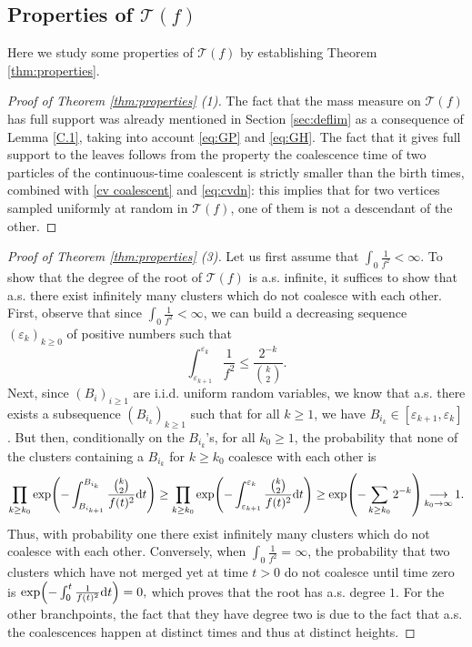 \documentclass[11pt]{article}
\theoremstyle{plain}
\theoremstyle{definition}
\theoremstyle{remark}
\newcommand{\1}{\mathbbm{1}} %
\newcommand{\e}{\varepsilon} %
\newcommand{\T}{\mathcal{T}} %
\let\originalleft\left
\let\originalright\right
\renewcommand{\left}{\mathopen{}\mathclose\bgroup\originalleft}
\renewcommand{\right}{\aftergroup\egroup\originalright}
\begin{document}
\subsection{Properties of $\mathcal{T}(f)$}


Here we study some properties of $\mathcal{T}(f)$ by establishing Theorem \ref{thm:properties}. 

\begin{proof}[Proof of Theorem \ref{thm:properties} (1)]
The fact that the mass measure on $\mathcal{T}(f)$ has full support was already mentioned in Section \ref{sec:deflim} as a consequence of Lemma \ref{C.1}, taking into account \eqref{eq:GP} and \eqref{eq:GH}.  The fact that it gives full support to the leaves follows from the property the coalescence time of two particles of the continuous-time coalescent is strictly smaller than the birth times, combined with \eqref{cv coalescent} and \eqref{eq:cvdn}: this implies that for two vertices sampled uniformly at random in $\mathcal{T}(f)$, one of them is not a descendant of the other.
\end{proof}

\begin{proof}[Proof of Theorem \ref{thm:properties} (3)]
Let us first assume that $\int_0 \frac{1}{f^2}<\infty$. To show that the degree of the root of $\T(f)$ is a.s. infinite, it suffices to show that a.s. there exist infinitely many clusters which do not coalesce with each other.
First, observe that since $\int_0 \frac{1}{f^2} <\infty$, we can build a decreasing sequence $(\e_k)_{k\ge 0}$ of positive numbers such that
\[
\int_{\e_{k+1}}^{\e_k} \frac{1}{f^2} \le \frac{2^{-k}}{\binom{k}{2}}.
\]
Next, since $(B_i)_{i\ge 1}$ are i.i.d. uniform random variables, we know that a.s. there exists a subsequence $(B_{i_k})_{k\ge 1}$ such that for all $k\ge 1$, we have $B_{i_k} \in [\e_{k+1},\e_k]$. But then, conditionally on the $B_{i_k}$'s, for all $k_0\ge 1$, the probability that none of the clusters containing a $B_{i_k}$ for $k\ge k_0$ coalesce with each other is
\[
\prod_{k\ge k_0} \exp \left(
-\int_{B_{i_{k+1}}}^{B_{i_k}} \frac{\binom{k}{2}}{f(t)^2} \mathrm{d}t
\right)\ge \prod_{k\ge k_0} \exp \left(
-\int_{\e_{k+1}}^{\e_k} \frac{\binom{k}{2}}{f(t)^2} \mathrm{d}t
\right)
\ge \exp \left(
-\sum_{k\ge k_0} 2^{-k}
\right)
\mathop{\longrightarrow}\limits_{k_0 \to \infty}
1.
\]
Thus, with probability one there exist infinitely many clusters which do not coalesce with each other. Conversely, when $\int_0 \frac{1}{f^2} = \infty$, the probability that two clusters which have not merged yet at time $t>0$ do not coalesce until time zero is 
$
\exp \left(-\int_0^t \frac{1}{f(t)^2} \mathrm{d}t\right) =0,
$ which proves that the root has a.s. degree $1$. For the other branchpoints, the fact that they have degree two is due to the fact that a.s. the coalescences happen at distinct times and thus at distinct heights.
\end{proof}
\end{document}

